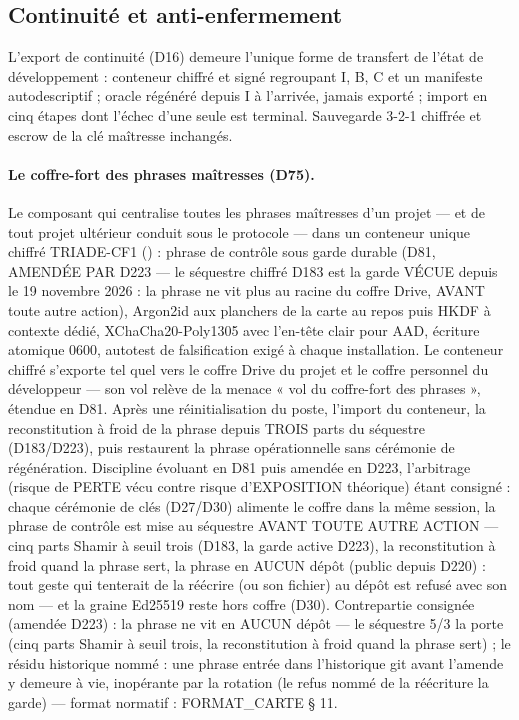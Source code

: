 \subsection{Continuité et anti-enfermement}

L'export de continuité (D16) demeure l'unique forme de transfert de l'état de
développement : conteneur chiffré et signé regroupant I, B, C et un manifeste
autodescriptif ; oracle régénéré depuis I à l'arrivée, jamais exporté ; import en cinq
étapes dont l'échec d'une seule est terminal. Sauvegarde 3-2-1 chiffrée et escrow de la
clé maîtresse inchangés.

\paragraph{Le coffre-fort des phrases maîtresses (D75).} Le composant qui centralise
toutes les phrases maîtresses d'un projet — et de tout projet ultérieur conduit sous le
protocole — dans un conteneur unique chiffré TRIADE-CF1 () :
phrase de contrôle sous garde durable (D81, AMENDÉE PAR D223 — le séquestre chiffré
D183 est la garde VÉCUE depuis le 19 novembre 2026 : la phrase ne vit plus au
racine du coffre Drive, AVANT toute autre action), Argon2id aux
planchers de la carte au repos puis HKDF à contexte dédié, XChaCha20-Poly1305 avec
l'en-tête clair pour AAD, écriture atomique 0600, autotest de falsification exigé à
chaque installation. Le conteneur chiffré s'exporte tel quel vers le coffre Drive du
projet et le coffre personnel du développeur — son vol relève de la menace « vol du
coffre-fort des phrases », étendue en D81. Après une réinitialisation du poste, l'import
du conteneur, la reconstitution à froid de la phrase depuis TROIS parts du
séquestre (D183/D223), puis
 restaurent la phrase opérationnelle sans cérémonie
de régénération. Discipline évoluant en D81 puis amendée en D223, l'arbitrage (risque de PERTE
vécu contre risque d'EXPOSITION théorique) étant consigné : chaque cérémonie de clés
(D27/D30) alimente le coffre dans la même session, la phrase de contrôle est mise
au séquestre AVANT TOUTE AUTRE ACTION — cinq parts Shamir à seuil trois (D183,
la garde active D223), la reconstitution à froid quand la phrase sert, la phrase
en AUCUN dépôt (public depuis D220) : tout geste qui tenterait de la réécrire
(ou son fichier) au dépôt est refusé avec son nom — et la graine Ed25519 reste
hors coffre (D30). Contrepartie consignée (amendée D223) : la
phrase ne vit en AUCUN dépôt — le séquestre 5/3 la porte (cinq parts Shamir à
seuil trois, la reconstitution à froid quand la phrase sert) ; le résidu
historique nommé : une phrase entrée dans l'historique git avant l'amende y
demeure à vie, inopérante par la rotation (le refus nommé de la réécriture la
garde) — format normatif : FORMAT\_CARTE § 11.

